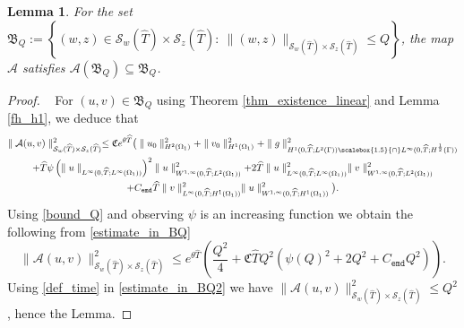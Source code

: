 \documentclass[11pt]{article}
\newcommand*{\medcap}{\mathbin{\scalebox{1.5}{\ensuremath{\cap}}}}
\newtheorem{lemma}[theorem]{Lemma}
\begin{document}
\begin{lemma}
For the set $\mathfrak{B}_Q:=\left\{ (w, z)\in \mathcal{S}_w(\widehat{T})\times\mathcal{S}_z(\widehat{T}):~ \parallel (w, z)\parallel_{\mathcal{S}_w(\widehat{T})\times\mathcal{S}_z(\widehat{T})} \leq Q \right\}$, the map $\mathcal{A}$ satisfies
$\mathcal{A}(\mathfrak{B}_Q)\subseteq \mathfrak{B}_Q$.
\end{lemma}
\begin{proof}~
For $(u, v)\in\mathfrak{B}_Q$ using Theorem \ref{thm_existence_linear} and Lemma \ref{fh_h1}, we deduce that  
\begin{multline}\label{estimate_in_BQ}
\parallel\mathcal{A}(u, v)\parallel_{\mathcal{S}_w(\widehat{T})\times\mathcal{S}_z(\widehat{T})}^2 \leq \mathfrak{C}e^{\theta \widehat{T}} \big( \parallel u_0\parallel^2_{H^2(\Omega_1)} + \parallel v_0\parallel^2_{H^1(\Omega_1)}  + \parallel g\parallel^2_{H^1(0, \widehat{T};L^2(\Gamma))\medcap L^{\infty}(0, \widehat{T};H^{\frac{1}{2}}(\Gamma))}  \\
+ \widehat{T} \psi \left( \parallel u\parallel_{L^{\infty}(0, \widehat{T}; L^{\infty}(\Omega_1))} \right)^2 \parallel u\parallel_{W^{1, \infty}(0, \widehat{T}; L^{2}(\Omega_1))}^2  + 2\widehat{T}\parallel u\parallel_{L^{\infty}(0,\widehat{T}; L^{\infty}(\Omega_1))}^2  \parallel v\parallel_{W^{1, \infty}(0,\widehat{T}; L^{2}(\Omega_1))}^2 \\+ C_{\texttt{emd}}\widehat{T}\parallel v\parallel_{L^{\infty}(0,\widehat{T}; H^{1}(\Omega_1))}^2  \parallel  u\parallel_{W^{1,\infty}(0,\widehat{T}; H^1(\Omega_1))}^2 \big).
\end{multline}
Using \eqref{bound_Q} and observing $\psi$ is an increasing function we obtain the following from \eqref{estimate_in_BQ}
\begin{equation}\label{estimate_in_BQ2}
\parallel\mathcal{A}(u, v)\parallel_{\mathcal{S}_w(\widehat{T})\times\mathcal{S}_z(\widehat{T})}^2 \leq e^{\theta \widehat{T}} \left(    \frac{Q^2}{4} +  \mathfrak{C}\widehat{T}Q^2\left(  \psi(Q)^2 +2Q^2 + C_{\texttt{emd}}Q^2 \right)\right).
\end{equation}
Using \eqref{def_time} in \eqref{estimate_in_BQ2} we have 
$\parallel\mathcal{A}(u, v)\parallel_{\mathcal{S}_w(\widehat{T})\times\mathcal{S}_z(\widehat{T})}^2 \leq Q^2$, hence the Lemma.
\end{proof}
\end{document}
